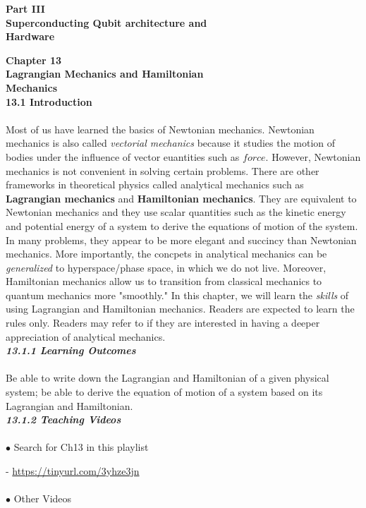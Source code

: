 \documentclass{article}
\newcommand{\bfit}[1]{\textit{\textbf{#1}}}
\begin{document}
\medskip

\begin{flushright}
\textbf{\LARGE Part III\\
Superconducting Qubit architecture and\\
Hardware}
\end{flushright}

\newpage
\noindent
\textbf{\Large Chapter 13\\
Lagrangian Mechanics and Hamiltonian\\
Mechanics}
\\[30pt]
\textbf{\large 13.1 Introduction}
\\\\
Most of us have learned the basics of Newtonian mechanics. Newtonian mechanics
is also called \textit{vectorial mechanics} because it studies the motion of bodies under the influence
of vector euantities such as $force$. However, Newtonian mechanics is not convenient in solving certain
problems. There are other frameworks in theoretical physics called analytical mechanics such as 
\textbf{Lagrangian mechanics} and \textbf{Hamiltonian mechanics}. They are equivalent to Newtonian mechanics and
they use scalar quantities such as the kinetic energy and potential energy of a system to derive
the equations of motion of the system. In many problems, they appear to be more elegant and succincy than 
Newtonian mechanics. More importantly, the concpets in analytical mechanics can be \textit{generalized}
to hyperspace/phase space, in which we do not live. Moreover, Hamiltonian mechanics allow us to transition from
classical mechanics to quantum mechanics more "smoothly." In this chapter, we will learn the 
\textit{skills} of using Lagrangian and Hamiltonian mechanics. Readers are expected to learn the rules only. Readers
may refer to \cite{goldstein2001pearson} if they are interested in having a deeper appreciation of analytical mechanics.
\\[20pt]
\bfit{\large 13.1.1 Learning Outcomes}
\\\\
Be able to write down the Lagrangian and Hamiltonian of a given physical system;
be able to derive the equation of motion of a system based on its Lagrangian and Hamiltonian.
\\[20pt]
\bfit{\large 13.1.2 Teaching Videos}
\\\\
$\bullet$ Search for Ch13 in this playlist

- \url{https://tinyurl.com/3yhze3jn}\\\\
$\bullet$ Other Videos
\end{document}
